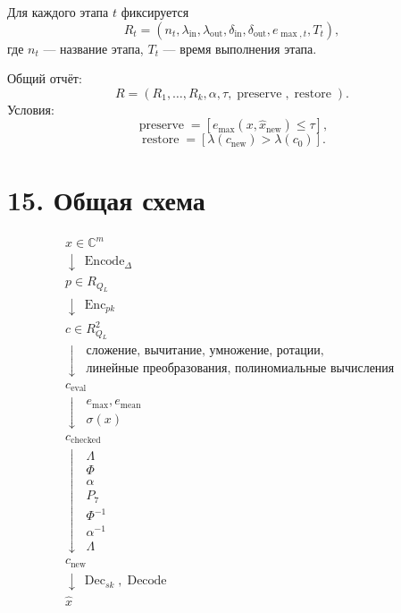 \documentclass[12pt]{article}
\newcommand{\Enc}{\operatorname{Enc}}
\newcommand{\Dec}{\operatorname{Dec}}
\newcommand{\Encode}{\operatorname{Encode}}
\newcommand{\Decode}{\operatorname{Decode}}
\newcommand{\Lift}{\Lambda}
\newcommand{\CtoS}{\Phi}
\newcommand{\StoC}{\Phi^{-1}}
\newcommand{\lvl}{\lambda}
\newcommand{\scl}{\delta}
\begin{document}
Для каждого этапа \(t\) фиксируется
\[
    R_t=
    \left(
        n_t,
        \lvl_{\operatorname{in}},
        \lvl_{\operatorname{out}},
        \scl_{\operatorname{in}},
        \scl_{\operatorname{out}},
        e_{\max,t},
        T_t
    \right),
\]
где \(n_t\) --- название этапа, \(T_t\) --- время выполнения этапа.

Общий отчёт:
\[
    R=
    \left(
        R_1,\ldots,R_k,
        \alpha,
        \tau,
        \operatorname{preserve},
        \operatorname{restore}
    \right).
\]
Условия:
\[
    \operatorname{preserve}
    =
    \left[
        e_{\max}(x,\hat{x}_{\operatorname{new}})\leq\tau
    \right],
\]
\[
    \operatorname{restore}
    =
    \left[
        \lvl(c_{\operatorname{new}})>\lvl(c_0)
    \right].
\]

\section*{15. Общая схема}

\[
\begin{array}{c}
x\in\mathbb{C}^{m}
\\[4pt]
\downarrow\ \Encode_{\Delta}
\\[4pt]
p\in R_{Q_L}
\\[4pt]
\downarrow\ \Enc_{pk}
\\[4pt]
c\in R_{Q_L}^{2}
\\[4pt]
\downarrow\
\begin{array}{c}
\text{сложение, вычитание, умножение, ротации,}\\
\text{линейные преобразования, полиномиальные вычисления}
\end{array}
\\[10pt]
c_{\operatorname{eval}}
\\[4pt]
\downarrow\
\begin{array}{c}
e_{\max},e_{\operatorname{mean}}\\
\sigma(x)
\end{array}
\\[10pt]
c_{\operatorname{checked}}
\\[4pt]
\downarrow\
\begin{array}{c}
\Lift\\
\CtoS\\
\alpha\\
P_7\\
\StoC\\
\alpha^{-1}\\
\Lift
\end{array}
\\[10pt]
c_{\operatorname{new}}
\\[4pt]
\downarrow\ \Dec_{sk},\Decode
\\[4pt]
\hat{x}
\end{array}
\]
\end{document}
